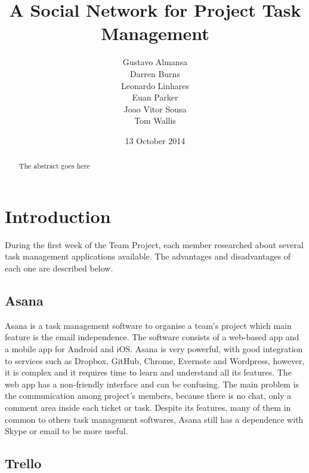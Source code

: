 \documentclass{l3proj}
\begin{document}
\title{A Social Network for Project Task Management}
\author{Gustavo Almansa\\
        Darren Burns \\
        Leonardo Linhares \\
        Euan Parker \\
        Joao Vitor Sousa \\
	Tom Wallis \\
}
\date{13 October 2014}
\maketitle
\begin{abstract}

The abstract goes here

\end{abstract}
\educationalconsent
\tableofcontents
\chapter{Introduction}
\label{intro}

During the first week of the Team Project, each member researched about several
task management applications available. The advantages and disadvantages of each
one are described below.

\section{Asana}
\label{asana}

Asana is a task management software to organise a team's project which main
feature is the email independence. The software consists of a web-based app and
a mobile app for Android and iOS. Asana is very powerful, with good integration
to services such as Dropbox, GitHub, Chrome, Evernote and Wordpress, however, it
is complex and it requires time to learn and understand all its features. The
web app has a non-friendly interface and can be confusing. The main problem is
the communication among project’s members, because there is no chat, only a
comment area inside each ticket or task. Despite its features, many of them in
common to others task management softwares, Asana still has a dependence with
Skype or email to be more useful.

\section{Trello}
\label{trello}
\end{document}
